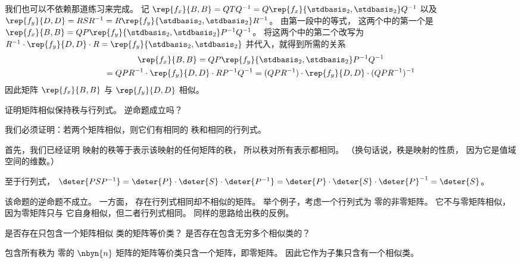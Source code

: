 \begin{exercises}
\begin{answer}
        我们也可以不依赖那道练习来完成。
        记
        $\rep{f_x}{B,B}=QTQ^{-1}=Q\rep{f_x}{\stdbasis_2,\stdbasis_2}Q^{-1}$
        以及
        $\rep{f_y}{D,D}=RSR^{-1}=R\rep{f_y}{\stdbasis_2,\stdbasis_2}R^{-1}$。
        由第一段中的等式， 
        这两个中的第一个是
        $\rep{f_x}{B,B}=QP\rep{f_y}{\stdbasis_2,\stdbasis_2}P^{-1}Q^{-1}$。
        将这两个中的第二个改写为
        $R^{-1}\cdot\rep{f_y}{D,D}\cdot R=\rep{f_y}{\stdbasis_2,\stdbasis_2}$
        并代入，就得到所需的关系
        \begin{multline*}
          \rep{f_x}{B,B}
          =QP\rep{f_y}{\stdbasis_2,\stdbasis_2}P^{-1}Q^{-1}  \\
          =QPR^{-1}\cdot\rep{f_y}{D,D}\cdot RP^{-1}Q^{-1}
          =(QPR^{-1})\cdot\rep{f_y}{D,D}\cdot (QPR^{-1})^{-1}
        \end{multline*}
        因此矩阵 \( \rep{f_x}{B,B}  \) 与 \( \rep{f_y}{D,D} \) 
        相似。 
      \end{answer}
  \item 
     证明矩阵相似保持秩与行列式。
     逆命题成立吗？
     \begin{answer}
        我们必须证明：若两个矩阵相似，则它们有相同的
        秩和相同的行列式。

        首先，我们已经证明 
        映射的秩等于表示该映射的任何矩阵的秩，
        所以秩对所有表示都相同。
        （换句话说，秩是映射的性质， 
        因为它是值域空间的维数。）

        至于行列式，
        \( \deter{PSP^{-1}}=\deter{P}\cdot\deter{S}\cdot\deter{P^{-1}}
           =\deter{P}\cdot\deter{S}\cdot\deter{P}^{-1}=\deter{S} \)。

       该命题的逆命题不成立。 
       一方面，
       存在行列式相同却不相似的矩阵。
       举个例子，考虑一个行列式为 
       零的非零矩阵。
       它不与零矩阵相似，因为零矩阵只与
       它自身相似，但二者行列式相同。 
       同样的思路给出秩的反例。 
     \end{answer}
  \item 
     是否存在只包含一个矩阵相似
     类的矩阵等价类？
     是否存在包含无穷多个相似类的？
     \begin{answer}
       包含所有秩为 
       零的 \( \nbyn{n} \) 矩阵的矩阵等价类只含一个矩阵，即零矩阵。
       因此它作为子集只含有一个相似类。


\end{answer}
\end{exercises}
